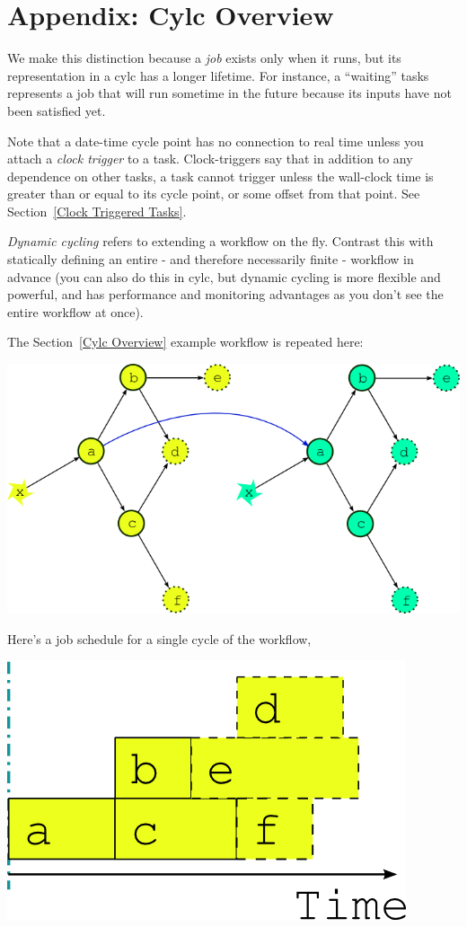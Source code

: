 \section{Appendix: Cylc Overview}
\label{Appendix Cylc Overview}


 We make this distinction because a {\em job}
exists only when it runs, but its representation in a cylc has a longer
lifetime.  For instance, a ``waiting'' tasks represents a job that will run
sometime in the future because its inputs have not been satisfied yet.

  Note that a date-time cycle point has no connection to real
time unless you attach a {\em clock trigger} to a task. Clock-triggers
say that in addition to any dependence on other tasks, a task cannot trigger
unless the wall-clock time is greater than or equal to its cycle point, or some
offset from that point. See Section~\ref{Clock Triggered Tasks}.

 {\em Dynamic
cycling} refers to extending a workflow on the fly. Contrast this with
statically defining an entire - and therefore necessarily finite - workflow in
advance (you can also do this in cylc, but dynamic cycling is more flexible and
powerful, and has performance and monitoring advantages as you don't see the
entire workflow at once).

The Section~\ref{Cylc Overview} example workflow is repeated here:
\begin{center}
    \includegraphics[width=0.4\columnwidth]{resources/tex/dep-two-cycles-linked}
\end{center}

Here's a job schedule for a single cycle of the workflow,
\begin{center}
    \includegraphics[width=0.17\columnwidth]{resources/tex/timeline-zero.png}
\end{center}

